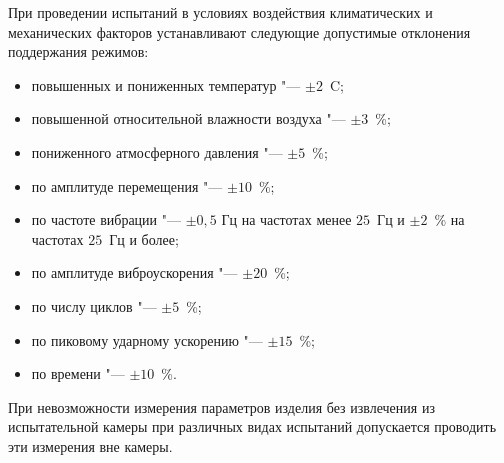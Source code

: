 При проведении испытаний в условиях воздействия климатических и механических факторов устанавливают следующие допустимые отклонения поддержания режимов:
%
\begin{itemize}
	\item повышенных и пониженных температур "--- $\pm 2$~\degree C;
	\item повышенной относительной влажности воздуха "--- $\pm 3$~\%;
	\item пониженного атмосферного давления "--- $\pm 5$~\%; %
	\item по амплитуде перемещения "--- $\pm 10$~\%;
	\item по частоте вибрации "--- $\pm 0,5$ Гц на частотах менее $25$~Гц и $\pm 2$~\% на частотах $25$~Гц и более;
	\item по амплитуде виброускорения "--- $\pm 20$~\%;
	\item по числу циклов "--- $\pm 5$~\%;
	\item по пиковому ударному ускорению "--- $\pm 15$~\%;
	\item по времени "--- $\pm 10$~\%. 
\end{itemize} 

При невозможности измерения параметров изделия без извлечения из испытательной камеры при различных видах испытаний допускается проводить эти измерения вне камеры.

